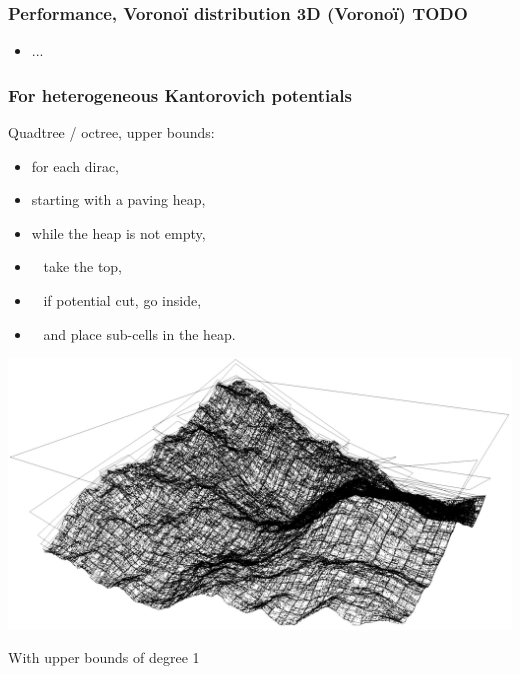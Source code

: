 \documentclass[aspectratio=169]{beamer}
\begin{document}
\begin{frame}
    \frametitle{Performance, Voronoï distribution 3D (Voronoï)    TODO}
    
    \begin{minipage}[c][0.6\textheight][c]{0.55\textwidth}
        
    \end{minipage}
    \begin{minipage}[c][0.6\textheight][c]{0.4\textwidth}
        \begin{itemize}
            \item ...
        \end{itemize}
    \end{minipage}
\end{frame}

\begin{frame}
    \frametitle{For heterogeneous Kantorovich potentials}

    \begin{minipage}[c][0.7\textheight][c]{0.45\textwidth}
        Quadtree / octree, upper bounds:
        \begin{itemize}
            \item for each dirac,
            \item starting with a paving heap,
            \item while the heap is not empty,
            \item \ \kern 2mm take the top,
            \item \ \kern 2mm if potential cut, go inside,
            \item \ \kern 2mm and place sub-cells in the heap.
        \end{itemize}
    \end{minipage}
    \textwidth
    \begin{minipage}[c][0.7\textheight][c]{0.5\textwidth}
        \begin{center}
            \includegraphics[width=\textwidth]{img/bound_p1.png}

            With upper bounds of degree 1
        \end{center}
    \end{minipage}
\end{frame}
\end{document}
